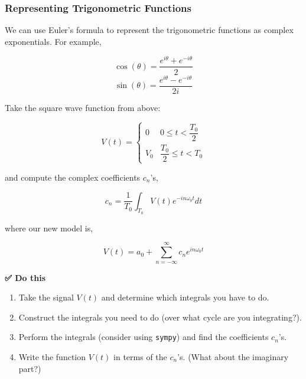 \subsubsection{Representing Trigonometric
Functions}\label{representing-trigonometric-functions}

We can use Euler's formula to represent the trigonometric functions as
complex exponentials. For example,

\[\cos(\theta) = \dfrac{e^{i\theta} + e^{-i\theta}}{2}\]
\[\sin(\theta) = \dfrac{e^{i\theta} - e^{-i\theta}}{2i}\]

Take the square wave function from above:

\[V(t) = \begin{cases} 0 & 0 \leq t < \dfrac{T_0}{2} \\ V_0 & \dfrac{T_0}{2} \leq t < T_0 \end{cases}\]

and compute the complex coefficients \(c_n\)'s,

\[c_n = \dfrac{1}{T_0}\int_{T_0}V(t)e^{-in\omega_0t}dt\]

where our new model is,

\[V(t) = a_0 + \sum_{n=-\infty}^{\infty} c_n e^{in\omega_0t}\]

\textbf{✅ Do this}

\begin{enumerate}
\def\labelenumi{\arabic{enumi}.}
\tightlist
\item
  Take the signal \(V(t)\) and determine which integrals you have to do.
\item
  Construct the integrals you need to do (over what cycle are you
  integrating?).
\item
  Perform the integrals (consider using \texttt{sympy}) and find the
  coefficients \(c_n\)'s.
\item
  Write the function \(V(t)\) in terms of the \(c_n\)'s. (What about the
  imaginary part?)
\end{enumerate}
